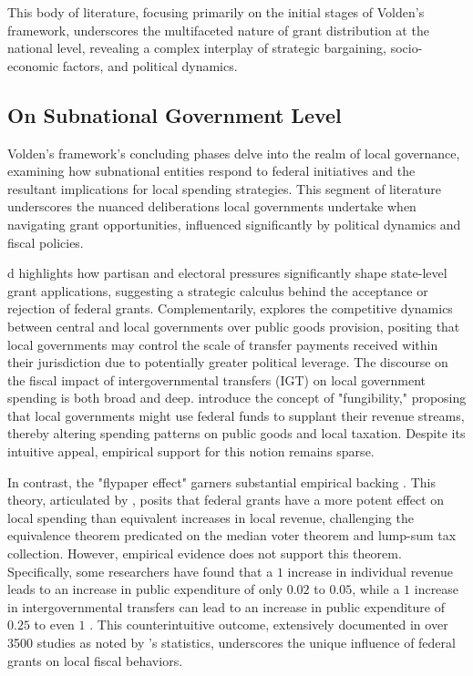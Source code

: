 This body of literature, focusing primarily on the initial stages of Volden's framework, underscores the multifaceted nature of grant distribution at the national level, revealing a complex interplay of strategic bargaining, socio-economic factors, and political dynamics.

\subsection{On Subnational Government Level}

Volden's framework's concluding phases delve into the realm of local governance, examining how subnational entities respond to federal initiatives and the resultant implications for local spending strategies. This segment of literature underscores the nuanced deliberations local governments undertake when navigating grant opportunities, influenced significantly by political dynamics and fiscal policies.

\Textcite{nicholson2012leaving} d highlights how partisan and electoral pressures significantly shape state-level grant applications, suggesting a strategic calculus behind the acceptance or rejection of federal grants. Complementarily, \Textcite{volden2005intergovernmental} explores the competitive dynamics between central and local governments over public goods provision, positing that local governments may control the scale of transfer payments received within their jurisdiction due to potentially greater political leverage.
The discourse on the fiscal impact of intergovernmental transfers (IGT) on local government spending is both broad and deep. \textcite{pack1993foreign}introduce the concept of "fungibility," proposing that local governments might use federal funds to supplant their revenue streams, thereby altering spending patterns on public goods and local taxation. Despite its intuitive appeal, empirical support for this notion remains sparse.

In contrast, the "flypaper effect" garners substantial empirical backing \parencite{hines1995anomalies,gamkhar2007impact}.  This theory, articulated by  \textcite{bradford1971analysis}, posits that federal grants have a more potent effect on local spending than equivalent increases in local revenue, challenging the equivalence theorem predicated on the median voter theorem and lump-sum tax collection. However, empirical evidence does not support this theorem. Specifically, some researchers have found that a $1$ increase in individual revenue leads to an increase in public expenditure of only $0.02$ to $0.05$, while a $1$ increase in intergovernmental transfers can lead to an increase in public expenditure of $0.25$ to even $1$ \parencite{bailey1998flypaper,dollery1996empirical,gamkhar2007impact}. This counterintuitive outcome, extensively documented in over 3500 studies as noted by \Textcite{inman2008flypaper}'s statistics, underscores the unique influence of federal grants on local fiscal behaviors.


